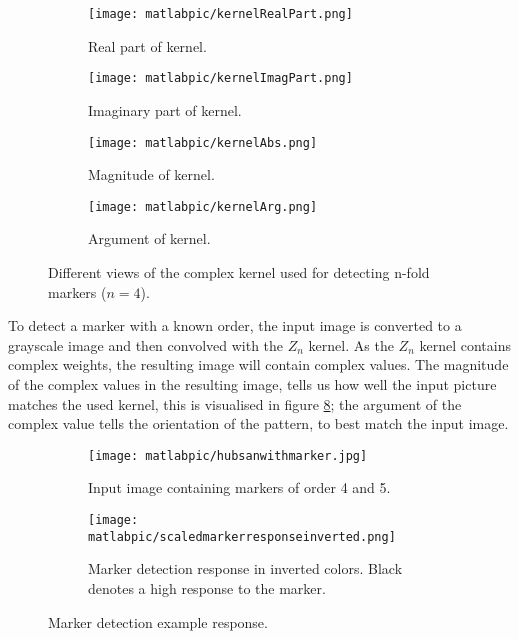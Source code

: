 \documentclass{article}
\begin{document}
\begin{figure}
\begin{subfigure}[t]{0.46\textwidth}
\texttt{[image: matlabpic/kernelRealPart.png]}
\caption{Real part of kernel.}
\label{figRealPartOfN4Kernel}
\end{subfigure}
\begin{subfigure}[t]{0.46\textwidth}
\texttt{[image: matlabpic/kernelImagPart.png]}
\caption{Imaginary part of kernel.}
\label{figImagPartOfN4Kernel}
\end{subfigure}
\begin{subfigure}[t]{0.46\textwidth}
\texttt{[image: matlabpic/kernelAbs.png]}
\caption{Magnitude of kernel.}
\label{figMagnitudeOfN4Kernel}
\end{subfigure}
\begin{subfigure}[t]{0.46\textwidth}
\texttt{[image: matlabpic/kernelArg.png]}
\caption{Argument of kernel.}
\label{figArgumentOfN4Kernel}
\end{subfigure}
\caption{Different views of the complex kernel used for detecting n-fold markers ($n = 4$).}
\label{figKernelToDetectPlainMarker}
\end{figure}
To detect a marker with a known order, the input image is converted to a grayscale image and then convolved with the $Z_n$ kernel.
As the $Z_n$ kernel contains complex weights, the resulting image will contain complex values.
The magnitude of the complex values in the resulting image, tells us how well the
input picture matches the used kernel, this is visualised in figure \ref{figDetectionExample};
the argument of the complex value tells the orientation of the
pattern, to best match the input image.
\begin{figure}
\begin{subfigure}[t]{0.46\textwidth}
\texttt{[image: matlabpic/hubsanwithmarker.jpg]}
\caption{Input image containing markers of order 4 and 5.}
\label{figHubsanInputImage}
\end{subfigure}
\begin{subfigure}[t]{0.46\textwidth}
\texttt{[image: matlabpic/scaledmarkerresponseinverted.png]}
\caption{Marker detection response in inverted colors. Black denotes a high response to the marker.}
\label{figHubsanMarkerDetectionReponse}
\end{subfigure}
\caption{Marker detection example response.}
\label{figDetectionExample}
\end{figure}
\end{document}
